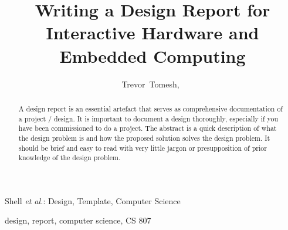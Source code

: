 \documentclass[journal]{IEEEtran}
\begin{document}

\title{Writing a Design Report for Interactive Hardware and Embedded Computing}


\author{Trevor~Tomesh,~
        }


%
{Shell \MakeLowercase{\textit{et al.}}: Design, Template, Computer Science }


\maketitle

\begin{abstract}
  A design report is an essential artefact that serves as comprehensive 
  documentation of a project / design. It is important to document a design
  thoroughly, especially if you have been commissioned to do a project. The 
  abstract is a quick description of what the design problem is and how the 
  proposed solution solves the design problem. It should be brief and easy 
  to read with very little jargon or presupposition of prior knowledge of the
  design problem. 

\end{abstract}

\begin{IEEEkeywords}
design, report, computer science, CS 807
\end{IEEEkeywords}



%
\IEEEpeerreviewmaketitle
\end{document}
